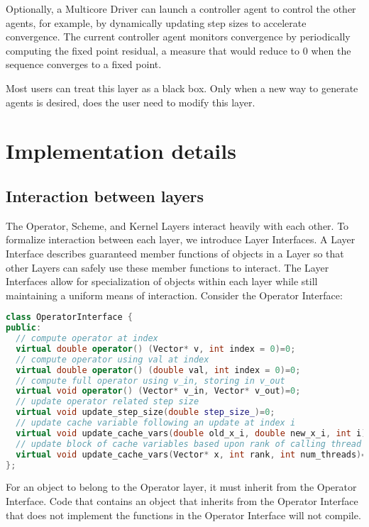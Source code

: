 Optionally, a Multicore Driver can launch a controller agent to control the other agents, for example, by dynamically updating step sizes to accelerate convergence.
The current controller agent monitors convergence by periodically computing the fixed point residual, a measure that would reduce to 0 when the sequence converges to a fixed point.

Most users can treat this layer as a black box. Only when a new way to generate agents is desired, does the user need to modify this layer.

\section{Implementation details}\label{sc:implement}

\subsection{Interaction between layers} \label{sc:interface}

The Operator, Scheme, and Kernel Layers interact heavily with each other. To formalize interaction between each layer, we introduce Layer Interfaces. A Layer Interface describes guaranteed member functions of objects in a Layer so that other Layers can safely use these member functions to interact. The Layer Interfaces allow for specialization of objects within each layer while still maintaining a uniform means of interaction. Consider the Operator Interface:
\begin{lstlisting}[language=C++,label=Operator_Interface]
class OperatorInterface {
public:
  // compute operator at index
  virtual double operator() (Vector* v, int index = 0)=0;
  // compute operator using val at index
  virtual double operator() (double val, int index = 0)=0;
  // compute full operator using v_in, storing in v_out
  virtual void operator() (Vector* v_in, Vector* v_out)=0;
  // update operator related step size
  virtual void update_step_size(double step_size_)=0;
  // update cache variable following an update at index i
  virtual void update_cache_vars(double old_x_i, double new_x_i, int i)=0;
  // update block of cache variables based upon rank of calling thread
  virtual void update_cache_vars(Vector* x, int rank, int num_threads)=0;
};
\end{lstlisting}

For an object to belong to the Operator layer, it must inherit from the Operator Interface.
Code that contains an object that inherits from the Operator Interface that does not implement the functions in the Operator Interface will not compile.

